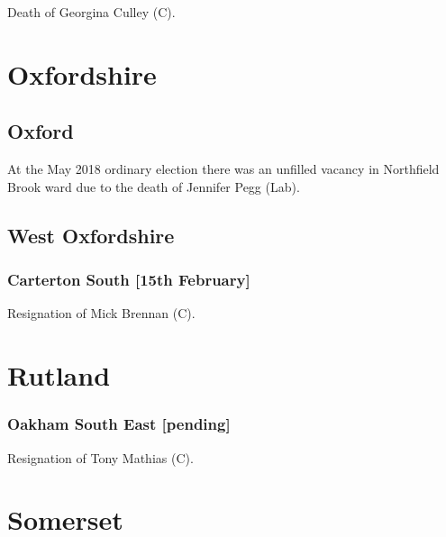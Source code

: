 \documentclass[a4paper,openany]{book}
\begin{document}
\begin{resultsiii}

Death of Georgina Culley (C).

\section{Oxfordshire}

\subsection*{Oxford}

At the May 2018 ordinary election there was an unfilled vacancy in Northfield Brook ward due to the death of Jennifer Pegg (Lab).

\subsection*{West Oxfordshire}

\subsubsection*{Carterton South \hspace*{\fill}\nolinebreak[1]%
\enspace\hspace*{\fill}
[15th February]}


Resignation of Mick Brennan (C).

\section{Rutland}

\subsubsection*{Oakham South East \hspace*{\fill}\nolinebreak[1]%
\enspace\hspace*{\fill}
[pending]}


Resignation of Tony Mathias (C).

\section{Somerset}


\end{resultsiii}
\end{document}
